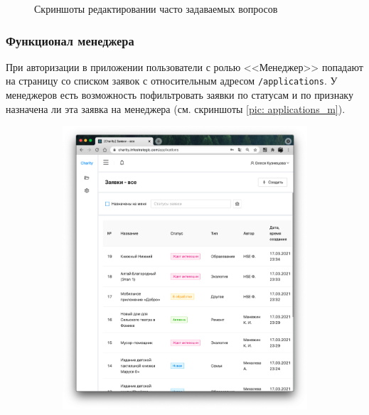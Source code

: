 \documentclass[a4paper,12pt,reqno]{article}
\begin{document}
\begin{figure}[H]
\begin{subfigure}[b]{0.475\linewidth}
		\end{subfigure}
		\caption{Скриншоты редактировании часто задаваемых вопросов}
		\label{pic: faq}
	\end{figure}
	
	\subsubsection{Функционал менеджера} \label{sec: man}
	
	При авторизации в приложении пользователи с ролью <<Менеджер>> попадают на страницу со списком заявок с относительным адресом \texttt{/applications}. У менеджеров есть возможность пофильтровать заявки по статусам и по признаку назначена ли эта заявка на менеджера (см. скриншоты \ref{pic: applications_m}). 
	
	\begin{figure}[H]
		\centering
		\begin{subfigure}[b]{0.475\linewidth}
			\includegraphics[width=\linewidth]{img/ro/applications_manager.png}
		\end{subfigure}
		\begin{subfigure}[b]{0.475\linewidth}

\end{subfigure}
\end{figure}
\end{document}
